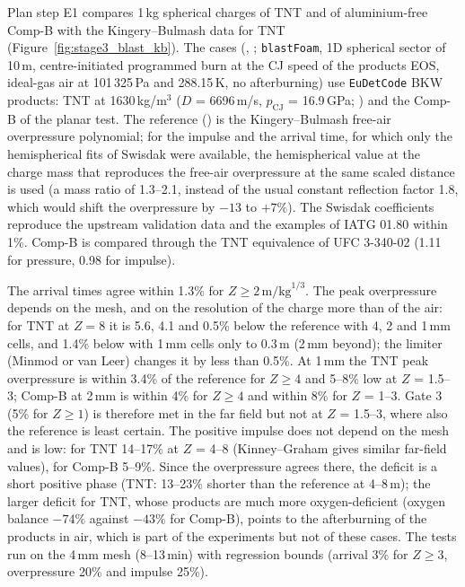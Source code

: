 \documentclass{article}
\begin{document}
Plan step E1 compares 1\,kg spherical charges of TNT and of aluminium-free Comp-B with the Kingery--Bulmash data for TNT \cite{kingery} (Figure~\ref{fig:stage3_blast_kb}). The cases (, ; \texttt{blastFoam}, 1D spherical sector of 10\,m, centre-initiated programmed burn at the CJ speed of the products EOS, ideal-gas air at 101\,325\,Pa and 288.15\,K, no afterburning) use \texttt{EuDetCode} BKW products: TNT at 1630\,kg/m$^3$ ($D$ = 6696\,m/s, $p_\text{CJ}$ = 16.9\,GPa; ) and the Comp-B of the planar test. The reference () is the Kingery--Bulmash free-air overpressure polynomial; for the impulse and the arrival time, for which only the hemispherical fits of Swisdak \cite{swisdak} were available, the hemispherical value at the charge mass that reproduces the free-air overpressure at the same scaled distance is used (a mass ratio of 1.3--2.1, instead of the usual constant reflection factor 1.8, which would shift the overpressure by $-13$ to $+7\%$). The Swisdak coefficients reproduce the upstream validation data and the examples of IATG 01.80 within 1\%. Comp-B is compared through the TNT equivalence of UFC 3-340-02 (1.11 for pressure, 0.98 for impulse).

The arrival times agree within 1.3\% for $Z \ge 2\,\text{m/kg}^{1/3}$. The peak overpressure depends on the mesh, and on the resolution of the charge more than of the air: for TNT at $Z = 8$ it is 5.6, 4.1 and 0.5\% below the reference with 4, 2 and 1\,mm cells, and 1.4\% below with 1\,mm cells only to 0.3\,m (2\,mm beyond); the limiter (Minmod or van Leer) changes it by less than 0.5\%. At 1\,mm the TNT peak overpressure is within 3.4\% of the reference for $Z \ge 4$ and 5--8\% low at $Z$ = 1.5--3; Comp-B at 2\,mm is within 4\% for $Z \ge 4$ and within 8\% for $Z$ = 1--3. Gate 3 (5\% for $Z \ge 1$) is therefore met in the far field but not at $Z$ = 1.5--3, where also the reference is least certain. The positive impulse does not depend on the mesh and is low: for TNT 14--17\% at $Z$ = 4--8 (Kinney--Graham \cite{kinney} gives similar far-field values), for Comp-B 5--9\%. Since the overpressure agrees there, the deficit is a short positive phase (TNT: 13--23\% shorter than the reference at 4--8\,m); the larger deficit for TNT, whose products are much more oxygen-deficient (oxygen balance $-74\%$ against $-43\%$ for Comp-B), points to the afterburning of the products in air, which is part of the experiments but not of these cases. The tests run on the 4\,mm mesh (8--13\,min) with regression bounds (arrival 3\% for $Z \ge 3$, overpressure 20\% and impulse 25\%).
\end{document}
